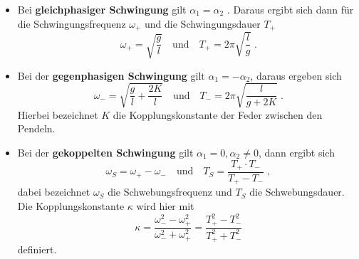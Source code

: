 \begin{itemize}
  \item Bei \textbf{gleichphasiger Schwingung} gilt $\alpha_1 = \alpha_2$ .
  Daraus ergibt sich dann für die Schwingungsfrequenz $\omega_+$
  und die Schwingungsdauer $T_+$
  \begin{equation}
  \omega_+ = \sqrt{\frac{g}{l}} \quad \text{und} \quad
  T_+ = 2\pi \sqrt{\frac{l}{g}}\;.
  \label{eqn:gls}
\end{equation}
\item Bei der \textbf{gegenphasigen Schwingung} gilt $\alpha_1 = - \alpha_2$,
daraus ergeben sich
\begin{equation}
   \omega_- = \sqrt{\frac{g}{l} + \frac{2K}{l}} \quad \text{und} \quad
   T_- = 2\pi \sqrt{\frac{l}{g+2K}}\;.
   \label{eqn:ggs}
 \end{equation}
 Hierbei bezeichnet $K$ die Kopplungskonstante der Feder zwischen den Pendeln.
 \item Bei der \textbf{gekoppelten Schwingung} gilt $\alpha_1 = 0, \alpha_2 \neq 0$,
 dann ergibt sich
 \begin{equation}
   \omega_S = \omega_+ - \omega_- \quad \text{und} \quad
   T_S = \frac{T_+\cdot T_-}{T_+ - T_-}\;,
   \label{eqn:gks}
 \end{equation}
 dabei bezeichnet $\omega_S$ die Schwebungsfrequenz und $T_S$ die Schwebungsdauer.
 Die Kopplungskonstante $\kappa$ wird hier mit
 \begin{equation}
   \kappa = \frac{\omega_- ^2 - \omega_+ ^2}{\omega_- ^2 + \omega_+ ^2}
   = \frac{T_+ ^2 - T_- ^2}{T_+ ^2 + T_- ^2}
   \label{eqn:K}
 \end{equation}
 definiert.

 \end{itemize}

